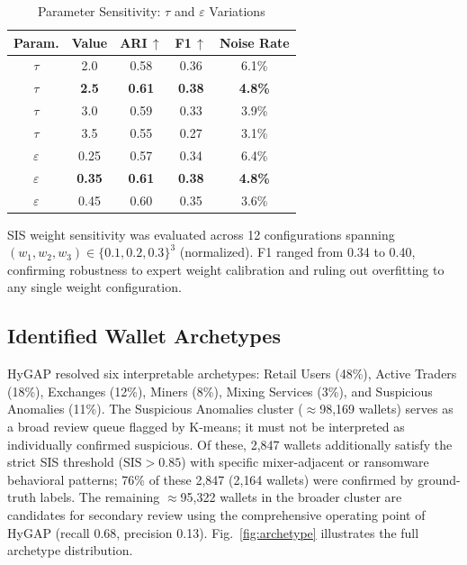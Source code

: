 \documentclass[conference]{IEEEtran}
\begin{document}
\begin{table}[t]
\caption{Parameter Sensitivity: $\tau$ and $\varepsilon$ Variations}
\label{tab:sensitivity}
\centering
\begin{tabular}{@{}ccccc@{}}
\toprule
\textbf{Param.} & \textbf{Value} &
\textbf{ARI\,$\uparrow$} & \textbf{F1\,$\uparrow$} &
\textbf{Noise Rate} \\
\midrule
$\tau$ & 2.0 & 0.58 & 0.36 & 6.1\% \\
$\tau$ & \textbf{2.5} & \textbf{0.61} & \textbf{0.38} & \textbf{4.8\%} \\
$\tau$ & 3.0 & 0.59 & 0.33 & 3.9\% \\
$\tau$ & 3.5 & 0.55 & 0.27 & 3.1\% \\
\midrule
$\varepsilon$ & 0.25 & 0.57 & 0.34 & 6.4\% \\
$\varepsilon$ & \textbf{0.35} & \textbf{0.61} & \textbf{0.38} & \textbf{4.8\%} \\
$\varepsilon$ & 0.45 & 0.60 & 0.35 & 3.6\% \\
\bottomrule
\end{tabular}
\end{table}

SIS weight sensitivity was evaluated across 12 configurations
spanning $(w_1,w_2,w_3) \in \{0.1,0.2,0.3\}^3$ (normalized).
F1 ranged from 0.34 to 0.40, confirming robustness to
expert weight calibration and ruling out overfitting to any
single weight configuration.

\subsection{Identified Wallet Archetypes}
HyGAP resolved six interpretable archetypes: Retail Users
(48\%), Active Traders (18\%), Exchanges (12\%), Miners (8\%),
Mixing Services (3\%), and Suspicious Anomalies (11\%). The
Suspicious Anomalies cluster ($\approx$98{,}169 wallets) serves
as a broad review queue flagged by K-means; it must not be
interpreted as individually confirmed suspicious. Of these,
2{,}847 wallets additionally satisfy the strict SIS threshold
($\mathrm{SIS} > 0.85$) with specific mixer-adjacent or
ransomware behavioral patterns; 76\% of these 2{,}847
(2{,}164 wallets) were confirmed by ground-truth labels.
The remaining $\approx$95{,}322 wallets in the broader cluster
are candidates for secondary review using the comprehensive
operating point of HyGAP (recall 0.68, precision 0.13).
Fig.~\ref{fig:archetype} illustrates the full archetype distribution.
\end{document}
